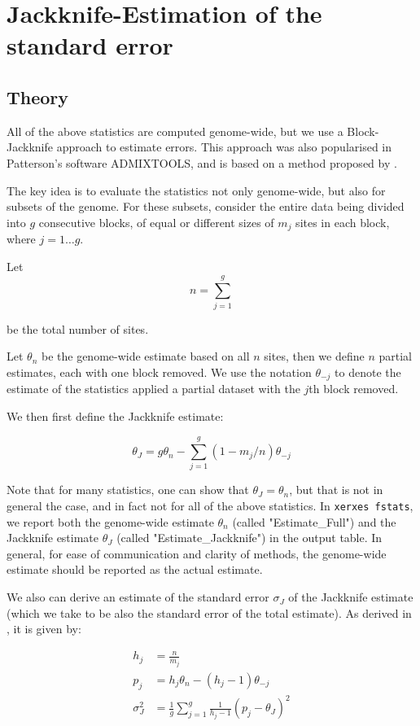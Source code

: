 \documentclass{article}
\begin{document}
\section{Jackknife-Estimation of the standard error}

\subsection{Theory}
All of the above statistics are computed genome-wide, but we use a Block-Jackknife approach to estimate errors. This approach was also popularised in Patterson's software ADMIXTOOLS, and is based on a method proposed by \cite{Busing1999-ev}.

The key idea is to evaluate the statistics not only genome-wide, but also for subsets of the genome. For these subsets, consider the entire data being divided into $g$ consecutive blocks, of equal or different sizes of $m_j$ sites in each block, where $j=1\ldots g$.

Let 
$$n = \sum_{j=1}^g$$

be the total number of sites.

Let $\theta_n$ be the genome-wide estimate based on all $n$ sites, then we define $n$ partial estimates, each with one block removed. We use the notation $\theta_{-j}$ to denote the estimate of the statistics applied a partial dataset with the $j$th block removed.

We then first define the Jackknife estimate:

$$\theta_J = g \theta_n - \sum_{j=1}^g (1 - m_j / n) \theta_{-j}$$

Note that for many statistics, one can show that $\theta_J=\theta_n$, but that is not in general the case, and in fact not for all of the above statistics. In \texttt{xerxes fstats}, we report both the genome-wide estimate $\theta_n$ (called "Estimate\_Full") and the Jackknife estimate $\theta_J$ (called "Estimate\_Jackknife") in the output table. In general, for ease of communication and clarity of methods, the genome-wide estimate should be reported as the actual estimate.

We also can derive an estimate of the standard error $\sigma_J$ of the Jackknife estimate (which we take to be also the standard error of the total estimate). As derived in \cite{Busing1999-ev}, it is given by:

\begin{equation}
\begin{split}
h_j &= \frac{n}{m_j}\\
p_j &= h_j \theta_n - (h_j - 1) \theta_{-j}\\
\sigma_J^2 &= \frac{1}{g} \sum_{j=1}^g \frac{1}{h_j - 1} (p_j - \theta_J)^2
\end{split}
\end{equation}
\end{document}
